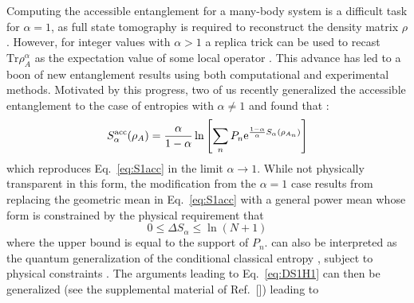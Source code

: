 Computing the accessible entanglement for a many-body system is a difficult task for $\alpha=1$, as full state tomography is required to reconstruct the density matrix $\rho$. However, for integer values with $\alpha > 1$ a replica trick can be used to recast $\mathrm{Tr} \rho_A^\alpha$ as the expectation value of some local operator \cite{Calabrese:2004hl}. This advance has led to a boon of new entanglement results using both computational \cite{Hastings:2010dc, Humeniuk:2012cq, McMinis:2013dp, Herdman:2014ey, Drut:2015fs} and experimental \cite{Daley:2012bd, Islam:2015cm, Kaufman:2016ep, Pichler:2016ec, Linke:2017tf, Lukin:2018wg} methods.  Motivated by this progress, two of us recently generalized the accessible entanglement to the case of \ren entropies with $\alpha \ne 1$ and found that \cite{Barghathi:2018oe}:
%
\begin{equation}
S_{\alpha}^{{\rm acc}} (\rho_A) = \frac{\alpha}{1-\alpha}\ln\left[ \sum_{n} P_n \mathrm{e}^{\frac{1-\alpha}{\alpha} S_{\alpha}(\rho_{A_n})}\right]
\label{eq:S_alpha_acc}
\end{equation} 
%
which reproduces Eq.~\eqref{eq:S1acc} in the limit $\alpha \to 1$. While not physically transparent in this form, the modification from the $\alpha=1$ case results from replacing the geometric mean in Eq.~\eqref{eq:S1acc} with a general power mean whose form is constrained by the physical requirement that
%
\begin{equation}
 0 \le \Delta S_\alpha \le \ln (N+1)
\label{eq:DeltaS_alpha_inq}
\end{equation}
%
where the upper bound is equal to the support of $P_n$.  can also be interpreted as the quantum generalization of the conditional classical \ren entropy \cite{Cachin97entropymeasures,GolshaniPashaYari:2009,Hayashi:2011,SKORIC:2011el,FehrBerens2014}, subject to physical constraints \cite{Barghathi:2018oe}. The arguments leading to Eq.~\eqref{eq:DS1H1} can then be generalized (see the supplemental material of Ref.~[]) leading to 
